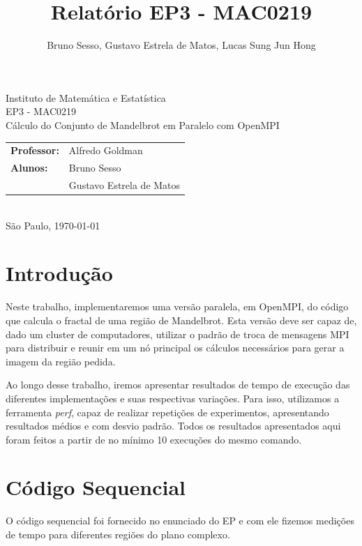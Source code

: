 \documentclass[12pt]{article}
\title{Relatório EP3 - MAC0219}
\author{Bruno Sesso, Gustavo Estrela de Matos, Lucas Sung Jun Hong}
\begin{document}
\doublespacing
\begin{titlepage}
    \vfill
    \begin{center}
        \vspace{0.5\textheight}
        \noindent
        Instituto de Matemática e Estatística \\
        EP3 - MAC0219 \\
        \vfill
        \noindent
        {\Large Cálculo do Conjunto de Mandelbrot
        em Paralelo com OpenMPI} \\
        \bigskip
        \bigskip
        \begin{tabular}{ll}
            {\bf Professor:} & {Alfredo Goldman} \\
            {\bf Alunos:}    & {Bruno Sesso} \\
                             & {Gustavo Estrela de Matos} \\
        \end{tabular} \\
        \vspace{\fill}
       \bigskip
        São Paulo, \today \\
       \bigskip
    \end{center}
\end{titlepage}

\pagebreak
\tableofcontents
\pagebreak

\section{Introdução}
Neste trabalho, implementaremos uma versão paralela, em OpenMPI, do 
código que calcula o fractal de uma região de Mandelbrot. Esta versão
deve ser capaz de, dado um cluster de computadores, utilizar o padrão
de troca de mensagens MPI para distribuir e reunir em um nó principal
os cálculos necessários para gerar a imagem da região pedida.

Ao longo desse trabalho, iremos apresentar resultados de tempo de 
execução das diferentes implementações e suas respectivas variações.
Para isso, utilizamos a ferramenta {\em perf}, capaz de realizar 
repetições de experimentos, apresentando resultados médios e com desvio
padrão. Todos os resultados apresentados aqui foram feitos a partir de
no mínimo 10 execuções do mesmo comando.
        

\newpage
\section{Código Sequencial}
O código sequencial foi fornecido no enunciado do EP e com ele fizemos
medições de tempo para diferentes regiões do plano complexo.
\end{document}

